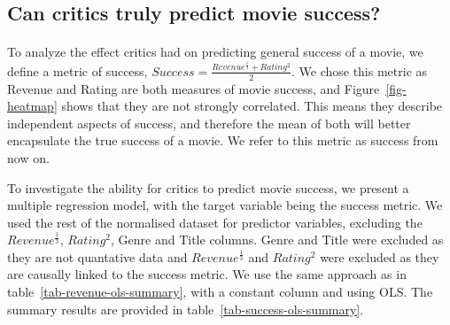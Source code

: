     \subsection{Can critics truly predict movie success?}
        \begin{multicols}{2}
            \paragraph{}
                To analyze the effect critics had on predicting general success of a movie, we
                    define a metric of success, $Success = \frac{Revenue^\frac{1}{3} +
                            Rating^2}{2}$.
                We chose this metric as Revenue and Rating are both measures of movie success,
                    and Figure~\ref{fig-heatmap} shows that they are not strongly correlated.
                This means they describe independent aspects of success, and therefore the mean
                    of both will better encapsulate the true success of a movie.
                We refer to this metric as success from now on.

                To investigate the ability for critics to predict movie success, we present a
                    multiple regression model, with the target variable being the success metric.
                We used the rest of the normalised dataset for predictor variables, excluding
                    the $Revenue^\frac{1}{3}$, $Rating^2$, Genre and Title columns.
                Genre and Title were excluded as they are not quantative data and
                    $Revenue^\frac{1}{3}$ and $Rating^2$ were excluded as they are causally linked
                    to the success metric.
                We use the same approach as in table~\ref{tab-revenue-ols-summary}, with a
                    constant column and using OLS.
                The summary results are provided in table~\ref{tab-success-ols-summary}.
        \end{multicols}

